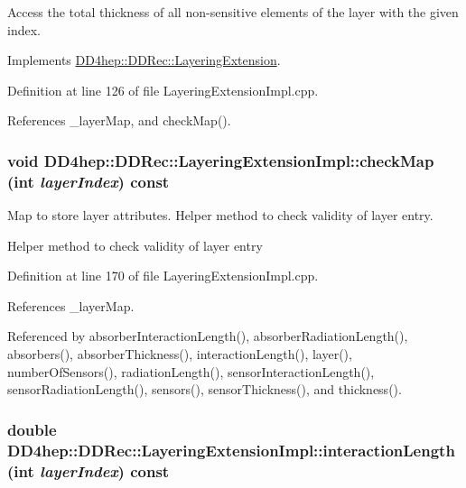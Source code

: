 Access the total thickness of all non-\/sensitive elements of the layer with the given index. 

Implements \hyperlink{class_d_d4hep_1_1_d_d_rec_1_1_layering_extension_ab4c19a0eccfd5cffc6816fa3b0ec9fb7}{DD4hep::DDRec::LayeringExtension}.

Definition at line 126 of file LayeringExtensionImpl.cpp.

References \_\-layerMap, and checkMap().\hypertarget{class_d_d4hep_1_1_d_d_rec_1_1_layering_extension_impl_ad948f77c1b4415d85c86a116d4f8ab62}{
\subsubsection[{checkMap}]{\setlength{\rightskip}{0pt plus 5cm}void DD4hep::DDRec::LayeringExtensionImpl::checkMap (int {\em layerIndex}) const}}
\label{class_d_d4hep_1_1_d_d_rec_1_1_layering_extension_impl_ad948f77c1b4415d85c86a116d4f8ab62}


Map to store layer attributes. Helper method to check validity of layer entry.

Helper method to check validity of layer entry 

Definition at line 170 of file LayeringExtensionImpl.cpp.

References \_\-layerMap.

Referenced by absorberInteractionLength(), absorberRadiationLength(), absorbers(), absorberThickness(), interactionLength(), layer(), numberOfSensors(), radiationLength(), sensorInteractionLength(), sensorRadiationLength(), sensors(), sensorThickness(), and thickness().\hypertarget{class_d_d4hep_1_1_d_d_rec_1_1_layering_extension_impl_ac49c6a128965c06b302fd0d2dda34de5}{
\subsubsection[{interactionLength}]{\setlength{\rightskip}{0pt plus 5cm}double DD4hep::DDRec::LayeringExtensionImpl::interactionLength (int {\em layerIndex}) const}}
\label{class_d_d4hep_1_1_d_d_rec_1_1_layering_extension_impl_ac49c6a128965c06b302fd0d2dda34de5}



